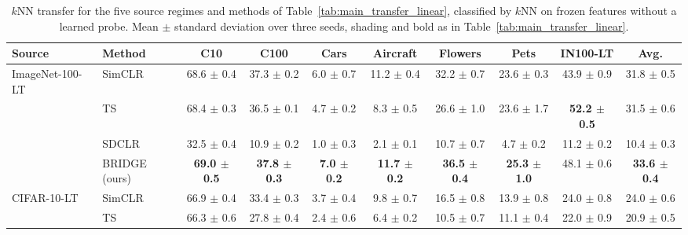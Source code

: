 \begin{table}[t]
\centering
\tiny
\setlength{\tabcolsep}{2.6pt}
\renewcommand{\arraystretch}{0.9}
\caption{$k$NN transfer for the five source regimes and methods of Table~\ref{tab:main_transfer_linear}, classified by $k$NN on frozen features without a learned probe. Mean $\pm$ standard deviation over three seeds, shading and bold as in Table~\ref{tab:main_transfer_linear}.}
\label{tab:main_transfer_knn}
\begin{adjustbox}{max width=\textwidth}
\begin{tabular}{l l c c c c c c c c}
\toprule
Source & Method & C10 & C100 & Cars & Aircraft & Flowers & Pets & IN100-LT & Avg. \\
\midrule
ImageNet-100-LT & SimCLR & 68.6 {\scriptsize$\pm$ 0.4} & 37.3 {\scriptsize$\pm$ 0.2} & 6.0 {\scriptsize$\pm$ 0.7} & 11.2 {\scriptsize$\pm$ 0.4} & 32.2 {\scriptsize$\pm$ 0.7} & 23.6 {\scriptsize$\pm$ 0.3} & 43.9 {\scriptsize$\pm$ 0.9} & 31.8 {\scriptsize$\pm$ 0.5} \\
 & TS & 68.4 {\scriptsize$\pm$ 0.3} & 36.5 {\scriptsize$\pm$ 0.1} & 4.7 {\scriptsize$\pm$ 0.2} & 8.3 {\scriptsize$\pm$ 0.5} & 26.6 {\scriptsize$\pm$ 1.0} & 23.6 {\scriptsize$\pm$ 1.7} & \textbf{52.2 {\scriptsize$\pm$ 0.5}} & 31.5 {\scriptsize$\pm$ 0.6} \\
 & SDCLR & 32.5 {\scriptsize$\pm$ 0.4} & 10.9 {\scriptsize$\pm$ 0.2} & 1.0 {\scriptsize$\pm$ 0.3} & 2.1 {\scriptsize$\pm$ 0.1} & 10.7 {\scriptsize$\pm$ 0.7} & 4.7 {\scriptsize$\pm$ 0.2} & 11.2 {\scriptsize$\pm$ 0.2} & 10.4 {\scriptsize$\pm$ 0.3} \\
\rowcolor{blue!10} & BRIDGE (ours) & \textbf{69.0 {\scriptsize$\pm$ 0.5}} & \textbf{37.8 {\scriptsize$\pm$ 0.3}} & \textbf{7.0 {\scriptsize$\pm$ 0.2}} & \textbf{11.7 {\scriptsize$\pm$ 0.2}} & \textbf{36.5 {\scriptsize$\pm$ 0.4}} & \textbf{25.3 {\scriptsize$\pm$ 1.0}} & 48.1 {\scriptsize$\pm$ 0.6} & \textbf{33.6 {\scriptsize$\pm$ 0.4}} \\
\midrule
CIFAR-10-LT & SimCLR & 66.9 {\scriptsize$\pm$ 0.4} & 33.4 {\scriptsize$\pm$ 0.3} & 3.7 {\scriptsize$\pm$ 0.4} & 9.8 {\scriptsize$\pm$ 0.7} & 16.5 {\scriptsize$\pm$ 0.8} & 13.9 {\scriptsize$\pm$ 0.8} & 24.0 {\scriptsize$\pm$ 0.8} & 24.0 {\scriptsize$\pm$ 0.6} \\
 & TS & 66.3 {\scriptsize$\pm$ 0.6} & 27.8 {\scriptsize$\pm$ 0.4} & 2.4 {\scriptsize$\pm$ 0.6} & 6.4 {\scriptsize$\pm$ 0.2} & 10.5 {\scriptsize$\pm$ 0.7} & 11.1 {\scriptsize$\pm$ 0.4} & 22.0 {\scriptsize$\pm$ 0.9} & 20.9 {\scriptsize$\pm$ 0.5} \\

\end{tabular}
\end{adjustbox}
\end{table}

